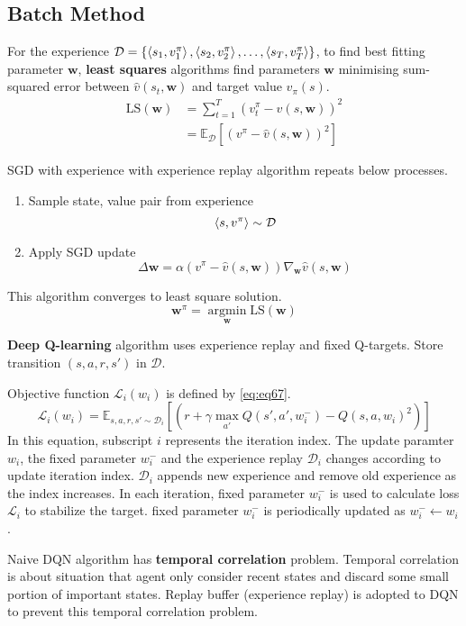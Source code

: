 \documentclass[
	10pt, %
]{article}
\theoremstyle{plain}
\newcommand{\mbb}[1]{\mathbb{#1}}
\newcommand{\mb}[1]{\mathbf{#1}}
\newcommand{\mc}[1]{\mathcal{#1}}
\newcommand{\tb}[1]{\textbf{#1}}
\numberwithin{equation}{subsection} %
\newcommand{\argmin}{\mathop{\mathrm{argmin}}\limits}
\begin{document}
\subsection{Batch Method}
For the experience $\mc{D} = \{\braket{s_1,v_1^\pi}, \braket{s_2,v_2^\pi}, \dots, \braket{s_T, v_T^\pi}\}$, to find best fitting parameter $\mb{w}$, \tb{least squares} algorithms find parameters $\mb{w}$ minimising sum-squared error between $\hat{v}(s_t, \mb{w})$ and target value $v_\pi(s)$.
\begin{equation} \label{eq:eq66}
    \begin{aligned}
    \text{LS}(\mb{w}) &= \sum_{t=1}^T (v^\pi_t - \hat{v}(s, \mb{w}))^2\\
    &= \mbb{E}_\mc{D} [(v^\pi - \hat{v}(s,\mb{w}))^2]
    \end{aligned}
\end{equation}

SGD with experience with experience replay algorithm repeats below processes.
\begin{enumerate}
    \item Sample state, value pair from experience
    $$\braket{s, v^\pi} \sim \mc{D}$$
    \item Apply SGD update
    $$\Delta \mb{w} = \alpha(v^\pi - \hat{v}(s, \mb{w}))\nabla_\mb{w} \hat{v}(s, \mb{w})$$
\end{enumerate}
This algorithm converges to least square solution. $$\mb{w}^\pi = \argmin_\mb{w} \text{LS}(\mb{w})$$

\tb{Deep Q-learning} algorithm uses experience replay and fixed Q-targets.
Store transition $(s,a,r,s')$ in $\mc{D}$.

Objective function $\mc{L}_i(w_i)$ is defined by \cref{eq:eq67}.
\begin{equation} \label{eq:eq67}
    \mc{L}_i(w_i) = \mbb{E}_{s,a,r,s' \sim \mc{D}_i} \left[\left(r + \gamma \max_{a'}Q(s',a',w_i^-)-Q(s,a,w_i)^2\right)\right]
\end{equation}
In this equation, subscript $i$ represents the iteration index. The update paramter $w_i$, the fixed parameter $w_i^-$ and the experience replay $\mc{D}_i$ changes according to update iteration index. 
$\mc{D}_i$ appends new experience and remove old experience as the index increases.
In each iteration, fixed parameter $w_i^-$ is used to calculate loss $\mc{L}_i$ to stabilize the target. fixed parameter $w_i^-$ is periodically updated as $w_i^- \gets w_i$.

Naive DQN algorithm has \tb{temporal correlation} problem.
Temporal correlation is about situation that agent only consider recent states and discard some small portion of important states. Replay buffer (experience replay) is adopted to DQN to prevent this temporal correlation problem.
\end{document}
